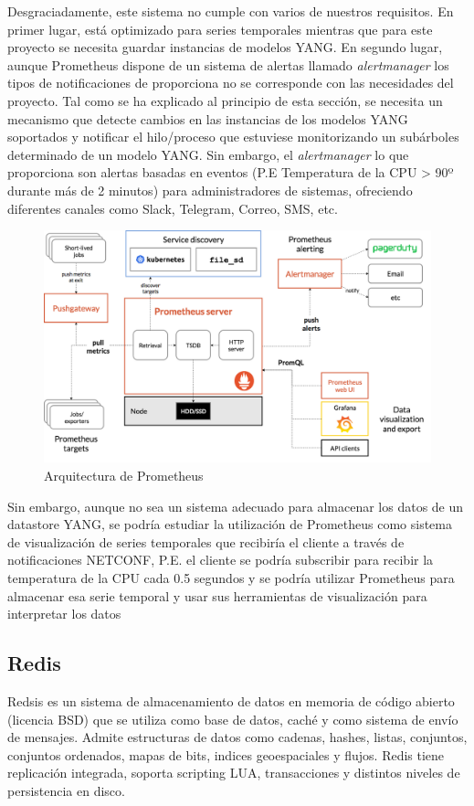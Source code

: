 Desgraciadamente, este sistema no cumple con varios de nuestros requisitos. En primer lugar,
está optimizado para series temporales mientras que para este proyecto se necesita guardar
instancias de modelos YANG. En segundo lugar, aunque Prometheus dispone de un sistema de alertas
llamado \textit{alertmanager} los tipos de notificaciones de proporciona no se corresponde con las 
necesidades del proyecto. Tal como se ha explicado al principio de esta sección, se necesita un 
mecanismo que detecte cambios en las instancias de los modelos YANG soportados y notificar el 
hilo/proceso que estuviese monitorizando un subárboles determinado de un modelo YANG. Sin embargo,
el \textit{alertmanager} lo que proporciona son alertas basadas en eventos (P.E Temperatura de la 
CPU > 90º durante más de 2 minutos) para administradores de sistemas, ofreciendo diferentes canales
como Slack, Telegram, Correo, SMS, etc. 


\begin{figure}
    \centering
    \includegraphics[width=15cm]{graphics/prometheus_architecture.png}
    \caption{Arquitectura de Prometheus}
    \label{fig:prometheus_estructura}
\end{figure}

Sin embargo, aunque no sea un sistema adecuado para almacenar los datos de un datastore YANG, se podría estudiar la utilización de Prometheus como sistema de visualización de series temporales que recibiría el cliente a través de notificaciones NETCONF, P.E. el cliente se podría subscribir para recibir la temperatura de la CPU cada 0.5 segundos y se podría utilizar Prometheus para almacenar esa serie temporal y usar sus herramientas de visualización para interpretar los datos 



\subsection{Redis} 
Redsis \cite{redsis_main_page} es un sistema de almacenamiento de datos en memoria de código abierto (licencia BSD) que se utiliza como base de datos, caché y como sistema de envío de mensajes. Admite estructuras de datos como cadenas, hashes, listas, conjuntos, conjuntos ordenados, mapas de bits, indices geoespaciales y flujos. Redis tiene replicación integrada, soporta scripting LUA, transacciones y distintos niveles de persistencia en disco. 

